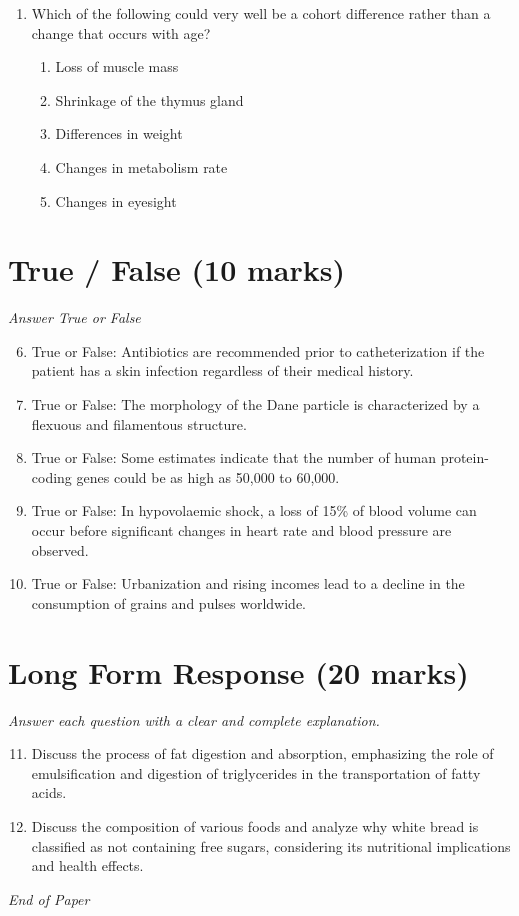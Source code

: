 \documentclass[12pt]{article}
\begin{document}
\begin{enumerate}[label=\arabic*.]
\begin{enumerate}[label=(\alph*)]
    \item Eco-friendly
    \item Sunshine
    \item Forest
    \item Rapid decay
    \item Organic
\end{enumerate}
\item Which of the following could very well be a cohort difference rather than a change that occurs with age?
\begin{enumerate}[label=(\alph*)]
    \item Loss of muscle mass
    \item Shrinkage of the thymus gland
    \item Differences in weight
    \item Changes in metabolism rate
    \item Changes in eyesight
\end{enumerate}
\end{enumerate}

\section*{True / False (10 marks)}
\textit{Answer True or False}
\begin{enumerate}[label=\arabic*.]
\setcounter{enumi}{5}
\item True or False: Antibiotics are recommended prior to catheterization if the patient has a skin infection regardless of their medical history.
\item True or False: The morphology of the Dane particle is characterized by a flexuous and filamentous structure.
\item True or False: Some estimates indicate that the number of human protein-coding genes could be as high as 50,000 to 60,000.
\item True or False: In hypovolaemic shock, a loss of 15\% of blood volume can occur before significant changes in heart rate and blood pressure are observed.
\item True or False: Urbanization and rising incomes lead to a decline in the consumption of grains and pulses worldwide.
\end{enumerate}

\section*{Long Form Response (20 marks)}
\textit{Answer each question with a clear and complete explanation.}
\begin{enumerate}[label=\arabic*.]
\setcounter{enumi}{10}
\item Discuss the process of fat digestion and absorption, emphasizing the role of emulsification and digestion of triglycerides in the transportation of fatty acids.
\item Discuss the composition of various foods and analyze why white bread is classified as not containing free sugars, considering its nutritional implications and health effects.
\end{enumerate}

\vfill
\noindent\textit{End of Paper}
\end{document}
